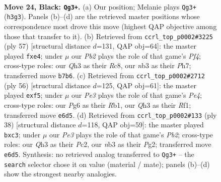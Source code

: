 \documentclass[11pt]{article}
\begin{document}
\clearpage

\begin{figure}[p]\centering
\begin{subfigure}{0.46\textwidth}\centering
\resizebox{\linewidth}{!}{%
\newchessgame
\chessboard[
  setfen={r5k1/pp2r2p/R3p1p1/2bB4/6PP/1N5q/1P3P2/2BQ1RK1 b - - 4 24},
  showmover=false,
  pgfstyle=straightmove, color=movearrow, markmove={h3-g3}
]}
\caption{}
\end{subfigure}\hfill
\begin{subfigure}{0.46\textwidth}\centering
\resizebox{\linewidth}{!}{%
\newchessgame
\chessboard[
  setfen={2r2r1k/6bp/p7/1p3p2/4BR2/P3Q1Pq/1P5P/1KNR4 b - - 0 29},
  showmover=false,
  pgfstyle=straightmove, color=movearrow, markmove={f5-e4}
]}
\caption{}
\end{subfigure}
\\[4pt]
\begin{subfigure}{0.46\textwidth}\centering
\resizebox{\linewidth}{!}{%
\newchessgame
\chessboard[
  setfen={2rq3k/p4prp/3p3Q/2n2b1p/2P1P3/7P/P3B1P1/1R3RK1 w - - 0 29},
  showmover=false,
  pgfstyle=straightmove, color=movearrow, markmove={e4-f5}
]}
\caption{}
\end{subfigure}\hfill
\begin{subfigure}{0.46\textwidth}\centering
\resizebox{\linewidth}{!}{%
\newchessgame
\chessboard[
  setfen={r2qr2k/1pp3pp/Pn1p4/5Q2/5P2/2b1B3/1PP3PP/R3R1K1 w - - 0 20},
  showmover=false,
  pgfstyle=straightmove, color=movearrow, markmove={b2-c3}
]}
\caption{}
\end{subfigure}
\caption{\textbf{Move 24, Black: \texttt{Qg3+}.} (a) Our position; Melanie plays \texttt{Qg3+} (\texttt{h3g3}). Panels (b)--(d) are the retrieved master positions whose correspondence most drove this move (highest QAP objective among those that transfer to it). (b) Retrieved from \texttt{ccrl\_top\_p0002\#3225} (ply 57) [structural distance $d$=131, QAP obj=64]: the master played \texttt{fxe4}; under $\mu$ our \emph{Pb2} plays the role of that game's \emph{Pf4}; cross-type roles: our \emph{Q}h3 as their \emph{R}c8, our \emph{n}b3 as their \emph{P}h7; transferred move \texttt{b7b6}. (c) Retrieved from \texttt{ccrl\_top\_p0002\#2712} (ply 56) [structural distance $d$=125, QAP obj=61]: the master played \texttt{exf5}; under $\mu$ our \emph{Pe3} plays the role of that game's \emph{Pe4}; cross-type roles: our \emph{P}g6 as their \emph{R}b1, our \emph{Q}h3 as their \emph{R}f1; transferred move \texttt{e6d5}. (d) Retrieved from \texttt{ccrl\_top\_p0002\#133} (ply 38) [structural distance $d$=118, QAP obj=59]: the master played \texttt{bxc3}; under $\mu$ our \emph{Pe3} plays the role of that game's \emph{Pb2}; cross-type roles: our \emph{Q}h3 as their \emph{P}c2, our \emph{n}b3 as their \emph{P}g2; transferred move \texttt{e6d5}. Synthesis: no retrieved analog transferred to \texttt{Qg3+} -- the \texttt{search} selector chose it on value (material / mate); panels (b)--(d) show the strongest nearby analogies.}
\label{fig:thought-m47}
\end{figure}
\end{document}
